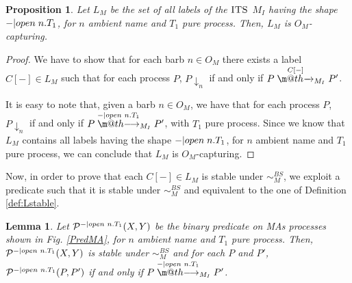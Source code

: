 \documentclass[copyright,creativecommons]{eptcs}
\makeatletter
\def\tr#1{\stackrel{#1}{\to}}
\let\oldrightarrow\to
\renewcommand{\to}[1][]{\ifthenelse{\equal{#1}{}}{\oldrightarrow}{\ensuremath{\xrightarrow{{}_{#1}}}}}
\def \rightarrowfill{\m@th\mathord{\smash-}\mkern-6mu\cleaders\hbox{$\mkern-2mu\mathord{\smash-}\mkern-2mu$}\hfill
  \mkern-6mu\mathord\rightarrow}
\newcommand{\barb}[1]{\downarrow_{#1}}
\newcommand{\bsbis}{\sim^{BS}}
\newcommand{\ilts}{\textsc{ITS}}
\def\tr#1{\stackrel{#1}{\rightarrowfill}}
\newcommand{\<}{\langle}
\renewcommand{\>}{\rangle}
\def\tr#1{\stackrel{#1}{\rightarrowfill}}
\def \rightarrowfill{\m@th\mathord{\smash-}\mkern-6mu\cleaders\hbox{$\mkern-2mu\mathord{\smash-}\mkern-2mu$}\hfill
  \mkern-6mu\mathord\rightarrow}
\newtheorem{lemma}{Lemma}{}
\newtheorem{proposition}{Proposition}{}
\makeatother
\begin{document}
\begin{proposition} \label{LMAO-capturing}\label{def:LMAs}
Let $L_M$ be the set of all labels of the $\ilts$ $M_I$ having
the shape  $-|open \hspace{1mm} n.T_1$, for $n$ ambient name and $T_1$ pure process.
Then, $L_M$ is $O_{\scriptscriptstyle{M}}$-capturing.
\end{proposition}

\begin{proof}
We have to show that for each barb $n \in O_{\scriptscriptstyle{M}}$ there exists a label $C[-] \in L_M$
such that for each process $P$, $P \barb n$ if and only if $P \tr{C[-]}_{M_I} P'$.

It is easy to note that, given a barb $n \in
O_{\scriptscriptstyle{M}}$, we have that for each process $P$, $P
\barb n$ if and only if $P \tr{-|open \hspace{1mm} n.T_1}_{M_I} P'$,
with $T_1$ pure process. Since we know that $L_M$ contains all
labels having the shape  $-|open \hspace{1mm} n.T_1$, for $n$
ambient name and $T_1$ pure process, we can conclude that $L_M$ is
$O_{\scriptscriptstyle{M}}$-capturing.
\end{proof}

Now, in order to prove that each $C[-] \in L_M$ is stable under
$\bsbis_{\scriptscriptstyle{M}}$, we exploit a predicate such that
it is stable under $\bsbis_{\scriptscriptstyle{M}}$ and equivalent
to the one of Definition \ref{def:Lstable}.

\begin{lemma} \label{lemma:PredMA}
Let $\mathcal P^{-|open \hspace{1mm} n.T_1}(X,Y)$ be the binary predicate
on MAs processes shown in Fig. \ref{PredMA}, for $n$ ambient name
and $T_1$ pure process.
Then, $\mathcal P^{-|open \hspace{1mm} n.T_1}(X,Y)$ is stable under $\bsbis_{\scriptscriptstyle{M}}$
and for each $P$ and $P'$, $\mathcal P^{-|open \hspace{1mm} n.T_1}(P,P')$ if and only if
$P \tr{-|open \hspace{1mm} n.T_1}_{M_I} P'$.
\end{lemma}
\end{document}

